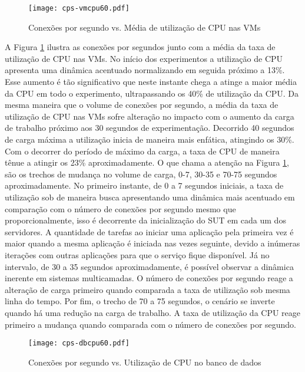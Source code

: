 \begin{figure}[htb]
	\centering
	\texttt{[image: cps-vmcpu60.pdf]}
	\caption{Conexões por segundo vs. Média de utilização de CPU nas VMs}
	\label{fig:cps-vmcpu60}
	\fdadospesquisa
\end{figure}

A Figura \ref{fig:cps-vmcpu60} ilustra as conexões por segundos junto com a média da taxa de utilização de CPU nas VMs. No início dos experimentos a utilização de CPU apresenta uma dinâmica acentuado normalizando em seguida próximo a 13\%. Esse aumento é tão significativo que neste instante chega a atinge a maior média da CPU em todo o experimento, ultrapassando os 40\% de utilização da CPU. Da mesma maneira que o volume de conexões por segundo, a média da taxa de utilização de CPU nas VMs sofre alteração no impacto com o aumento da carga de trabalho próximo aos 30 segundos de experimentação. Decorrido 40 segundos de carga máxima a utilização inicia de maneira mais enfática, atingindo os 30\%. Com o decorrer do período de máximo da carga, a taxa de CPU de maneira tênue a atingir os 23\% aproximadamente. O que chama a atenção na Figura \ref{fig:cps-vmcpu60}, são os trechos de mudança no volume de carga, 0-7, 30-35 e 70-75 segundos aproximadamente. No primeiro instante, de 0 a 7 segundos iniciais, a taxa de utilização sob de maneira busca apresentando uma dinâmica mais acentuado em comparação com o número de conexões por segundo mesmo que proporcionalmente, isso é decorrente da inicialização do SUT em cada um dos servidores. A quantidade de tarefas ao iniciar uma aplicação pela primeira vez é maior quando a mesma aplicação é iniciada nas vezes seguinte, devido a inúmeras iterações com outras aplicações para que o serviço fique disponível. Já no intervalo, de 30 a 35 segundos aproximadamente, é possível observar a dinâmica inerente em sistemas multicamadas. O número de conexões por segundo reage a alteração de carga primeiro quando comparada a taxa de utilização sob mesma linha do tempo. Por fim, o trecho de 70 a 75 segundos, o cenário se inverte quando há uma redução na carga de trabalho. A taxa de utilização da CPU reage primeiro a mudança quando comparada com o número de conexões por segundo.

\begin{figure}[htb]
	\centering
	\texttt{[image: cps-dbcpu60.pdf]}
	\caption{Conexões por segundo vs. Utilização de CPU no banco de dados}
	\label{fig:cps-dbcpu60}
	\fdadospesquisa
\end{figure}

